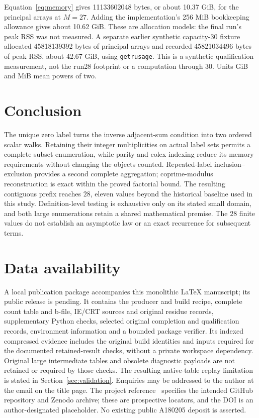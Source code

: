\documentclass[11pt]{article}
\theoremstyle{definition}
\theoremstyle{remark}
\begin{document}
Equation~\eqref{eq:memory} gives 11133602048 bytes, or about 10.37 GiB,
for the principal arrays at $M=27$. Adding the implementation's 256 MiB
bookkeeping allowance gives about 10.62 GiB. These are allocation models:
the final run's peak RSS was not measured. A separate earlier synthetic
capacity-30 fixture allocated 45818139392 bytes of principal arrays and
recorded 45821034496 bytes of peak RSS, about 42.67 GiB, using
\texttt{getrusage}. This is a synthetic qualification measurement, not
the run28 footprint or a computation through 30. Units GiB and MiB mean
powers of two.

\section{Conclusion}

The unique zero label turns the inverse adjacent-sum condition into two
ordered scalar walks. Retaining their integer multiplicities on actual
label sets permits a complete subset enumeration, while parity and colex
indexing reduce its memory requirements without changing the objects counted.
Repeated-label inclusion--exclusion provides a second complete aggregation;
coprime-modulus reconstruction is exact within the proved factorial bound.
The resulting contiguous prefix reaches $28$, eleven values beyond the
historical baseline used in this study. Definition-level testing is exhaustive
only on its stated small domain, and both large enumerations retain a shared
mathematical premise. The 28 finite values do not establish an asymptotic law
or an exact recurrence for subsequent terms.

\section*{Data availability}

A local publication package accompanies this monolithic LaTeX manuscript;
its public release is pending. It contains the producer and build recipe,
complete count table and b-file, IE/CRT sources and original residue records,
supplementary Python checks, selected original completion and qualification
records, environment information and a bounded package verifier.
Its indexed compressed evidence includes the original build identities and
inputs required for the documented retained-result checks, without a private
workspace dependency. Original large intermediate tables and obsolete
diagnostic payloads are not retained or required by those checks.
The resulting native-table replay limitation is stated in
Section~\ref{sec:validation}. Enquiries may be addressed to the author
at the email on the title page.
The project reference~\cite{corti} specifies the
intended GitHub repository and Zenodo archive; these are prospective
locators, and the DOI is an author-designated placeholder. No existing public
A180205 deposit is asserted.
\end{document}
